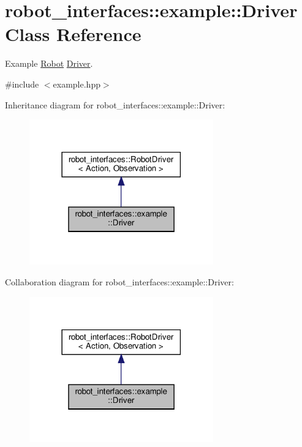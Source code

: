 \hypertarget{classrobot__interfaces_1_1example_1_1Driver}{}\section{robot\+\_\+interfaces\+:\+:example\+:\+:Driver Class Reference}
\label{classrobot__interfaces_1_1example_1_1Driver}


Example \hyperlink{classrobot__interfaces_1_1Robot}{Robot} \hyperlink{classrobot__interfaces_1_1example_1_1Driver}{Driver}.  




{\ttfamily \#include $<$example.\+hpp$>$}



Inheritance diagram for robot\+\_\+interfaces\+:\+:example\+:\+:Driver\+:
\nopagebreak
\begin{figure}[H]
\begin{center}
\leavevmode
\includegraphics[width=225pt]{classrobot__interfaces_1_1example_1_1Driver__inherit__graph}
\end{center}
\end{figure}


Collaboration diagram for robot\+\_\+interfaces\+:\+:example\+:\+:Driver\+:
\nopagebreak
\begin{figure}[H]
\begin{center}
\leavevmode
\includegraphics[width=225pt]{classrobot__interfaces_1_1example_1_1Driver__coll__graph}
\end{center}
\end{figure}
